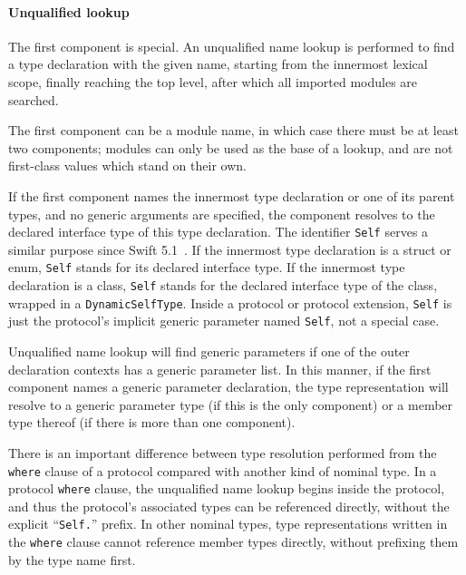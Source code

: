 \documentclass[a4paper,headsepline,bibliography=totoc,toc=flat,fleqn,twoside=semi]{scrbook}
\theoremstyle{definition}
\theoremstyle{definition}
\theoremstyle{definition}
\begin{document}
\paragraph{Unqualified lookup} The first component is special. An unqualified name lookup is performed to find a type declaration with the given name, starting from the innermost lexical scope, finally reaching the top level, after which all imported modules are searched.

The first component can be a module name, in which case there must be at least two components; modules can only be used as the base of a lookup, and are not first-class values which stand on their own.

If the first component names the innermost type declaration or one of its parent types, and no generic arguments are specified, the component resolves to the declared interface type of this type declaration. The identifier \texttt{Self} serves a similar purpose since Swift 5.1~\cite{se0068}. If the innermost type declaration is a struct or enum, \texttt{Self} stands for its declared interface type. If the innermost type declaration is a class, \texttt{Self} stands for the declared interface type of the class, wrapped in a \texttt{DynamicSelfType}. Inside a protocol or protocol extension, \texttt{Self} is just the protocol's implicit generic parameter named \texttt{Self}, not a special case.

Unqualified name lookup will find generic parameters if one of the outer declaration contexts has a generic parameter list. In this manner, if the first component names a generic parameter declaration, the type representation will resolve to a generic parameter type (if this is the only component) or a member type thereof (if there is more than one component).

There is an important difference between type resolution performed from the \texttt{where} clause of a protocol compared with another kind of nominal type. In a protocol \texttt{where} clause, the unqualified name lookup begins inside the protocol, and thus the protocol's associated types can be referenced directly, without the explicit ``\texttt{Self.}'' prefix. In other nominal types, type representations written in the \texttt{where} clause cannot reference member types directly, without prefixing them by the type name first.
\end{document}
